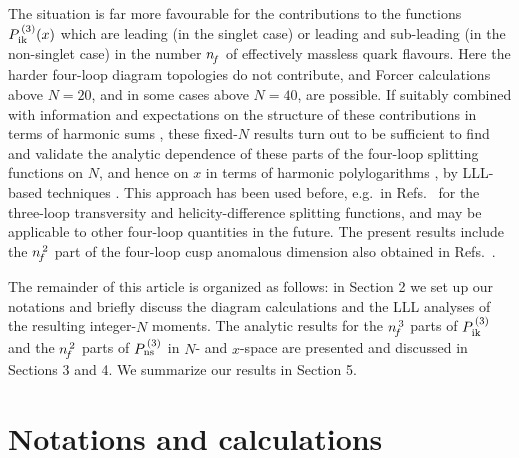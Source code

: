 \documentclass[12pt]{article}
\begin{document}
The situation is far more favourable for the contributions to the functions
$P_{\:\!\rm ik}^{\,(3)}(x)$ which are leading (in the singlet case) or 
leading and sub-leading (in the non-singlet case) in the number ${n^{}_{\! f}}$ of 
effectively massless quark flavours. Here the harder four-loop diagram
topologies do not contribute, and {\sc Forcer} calculations above $N = 20$,
and in some cases above $N = 40$, are possible.
If suitably combined with information and expectations on the structure of
these contributions in terms of harmonic sums \cite{Hsums,BKurth}, these 
fixed-$N$ results turn out to be sufficient to find and validate the analytic 
dependence of these parts of the four-loop splitting functions on $N$,
and hence on $x$ in terms of harmonic polylogarithms \cite{Hpols}, by 
LLL-based techniques \cite{LLL,axbAlg,Calc}. This approach has been used
before, e.g.~in Refs.~\cite{VelizTrv,mvvDP2} for the three-loop transversity 
and helicity-difference splitting functions, and may be applicable to other
four-loop quantities in the future.
The present results include the ${n^{\,2}_{\! f}}$ part of the four-loop cusp anomalous 
dimension also obtained in Refs.~\cite{HSSS16,GHKM15,GrozinLL}.

The remainder of this article is organized as follows: in Section 2 we set
up our notations and briefly discuss the diagram calculations and the LLL
analyses of the resulting integer-$N$ moments. 
The analytic results for the ${n^{\,3}_{\! f}}$ parts of $P_{\:\!\rm ik}^{\,(3)}$ and 
the ${n^{\,2}_{\! f}}$ parts of $P_{\:\!\rm ns}^{\,(3)}$ in $N$- and $x$-space are 
presented and discussed in Sections 3 and 4.
We summarize our results in Section 5.

%
\section{Notations and calculations}
\label{sec:calc}
\setcounter{equation}{0}
 
\end{document}
